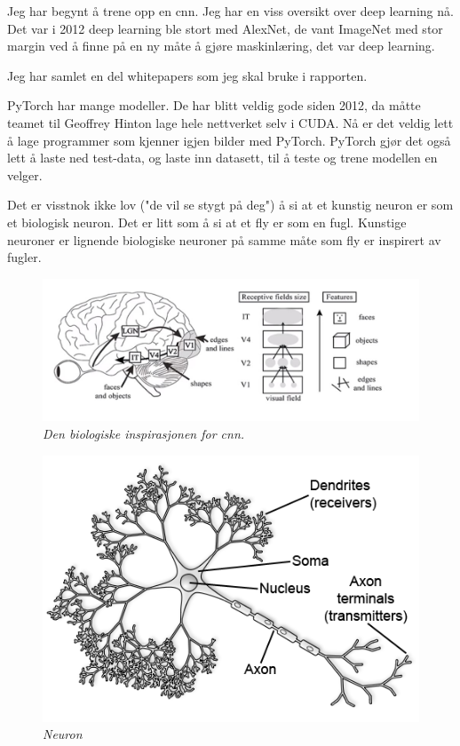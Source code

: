 Jeg har begynt å trene opp en cnn. Jeg har en viss oversikt over deep learning nå. Det var i 2012 deep learning ble stort med AlexNet, de vant ImageNet med stor margin ved å finne på en ny måte å gjøre maskinlæring, det var deep learning.

Jeg har samlet en del whitepapers som jeg skal bruke i rapporten.

PyTorch har mange modeller. De har blitt veldig gode siden 2012, da måtte teamet til Geoffrey Hinton lage hele nettverket selv i CUDA. Nå er det veldig lett å lage programmer som kjenner igjen bilder med PyTorch. PyTorch gjør det også lett å laste ned test-data, og laste inn datasett, til å teste og trene modellen en velger.

Det er visstnok ikke lov ("de vil se stygt på deg") å si at et kunstig neuron er som et biologisk neuron. Det er litt som å si at et fly er som en fugl. Kunstige neuroner er lignende biologiske neuroner på samme måte som fly er inspirert av fugler. 

\begin{figure} 
\begin{center} 
\includegraphics{figures/biological_inspiration_cnn}
\caption{\small \sl Den biologiske inspirasjonen for cnn.\label{fig:datapoints}} 
\end{center} 
\end{figure} 

\begin{figure} 
\begin{center} 
\includegraphics{figures/neuron_figure}
\caption{\small \sl Neuron\label{fig:datapoints}}
\end{center} 
\end{figure} 

